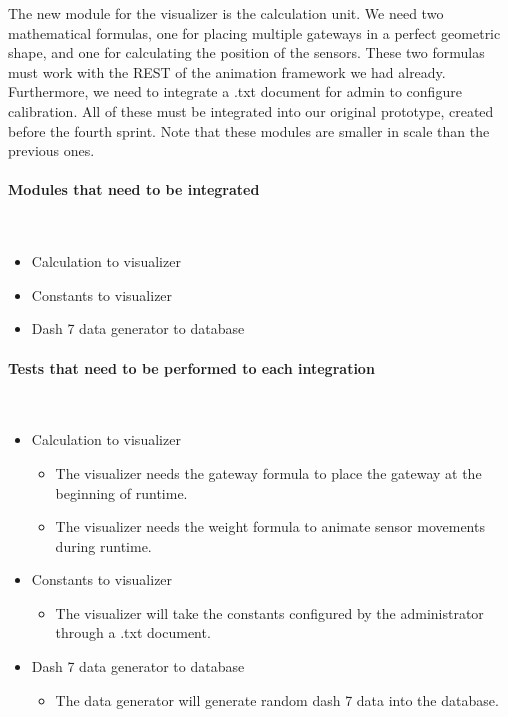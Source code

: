 \documentclass[../document]{subfiles}
\begin{document}
The new module for the visualizer is the calculation unit. We need two mathematical formulas, one for placing multiple gateways in a perfect geometric shape, and one for calculating the position of the sensors. These two formulas must work with the \gls{REST} of the animation framework we had already. Furthermore, we need to integrate a .txt document for admin to configure calibration. All of these must be integrated into our original prototype, created before the fourth sprint. Note that these modules are smaller in scale than the previous ones.

\paragraph{Modules that need to be integrated} \ \\
\begin{itemize}
	\item
	Calculation to visualizer
	\item
	Constants to visualizer
	\item
	Dash 7 data generator to database
\end{itemize}

\paragraph{Tests that need to be performed to each integration} \ \\
\begin{itemize}
	\item
	Calculation to visualizer
	\begin{itemize}
		\item
		The visualizer needs the gateway formula to place the gateway at the beginning of runtime.
		\item
		The visualizer needs the weight formula to animate sensor movements during runtime.
	\end{itemize}
	\item
	Constants to visualizer
	\begin{itemize}
		\item
		The visualizer will take the constants configured by the administrator through a .txt document.
	\end{itemize}
	\item
	Dash 7 data generator to database
	\begin{itemize}
		\item
		The data generator will generate random dash 7 data into the database.
	\end{itemize}
\end{itemize}
\end{document}
